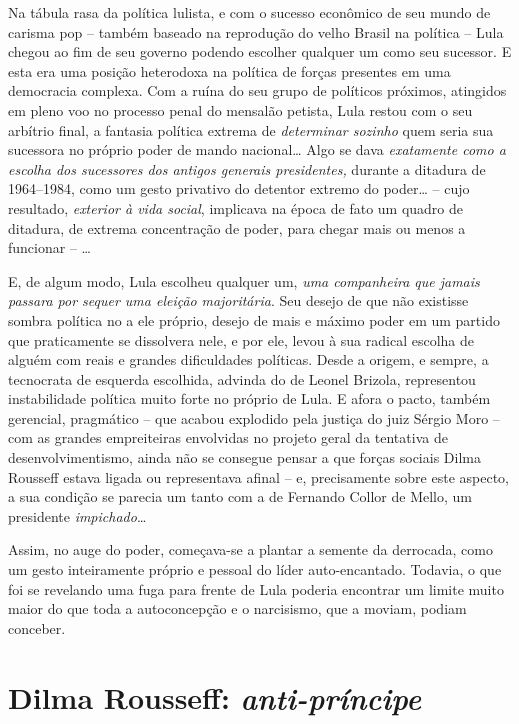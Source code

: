 Na tábula rasa da política lulista, e com o sucesso econômico de seu
mundo de carisma pop -- também baseado na reprodução do velho Brasil na
política -- Lula chegou ao fim de seu governo podendo escolher qualquer
um como seu sucessor. E esta era uma posição heterodoxa na política de
forças presentes em uma democracia complexa. Com a ruína do seu grupo de
políticos próximos, atingidos em pleno voo no processo penal do mensalão
petista, Lula restou com o seu arbítrio final, a fantasia política
extrema de \emph{determinar sozinho} quem seria sua sucessora no próprio
poder de mando nacional… Algo se dava \emph{exatamente como a escolha
dos sucessores dos antigos generais presidentes,} durante a ditadura de
1964--1984, como um gesto privativo do detentor extremo do poder… --
cujo resultado, \emph{exterior à vida social}, implicava na época de
fato um quadro de ditadura, de extrema concentração de poder, para
chegar mais ou menos a funcionar -- …

E, de algum modo, Lula escolheu qualquer um, \emph{uma companheira que
jamais passara por sequer uma eleição} \emph{majoritária}. Seu desejo de
que não existisse sombra política no  a ele próprio, desejo de mais e
máximo poder em um partido que praticamente se dissolvera nele, e por
ele, levou à sua radical escolha de alguém com reais e grandes
dificuldades políticas. Desde a origem, e sempre, a tecnocrata de
esquerda escolhida, advinda do  de Leonel Brizola, representou
instabilidade política muito forte no próprio  de Lula. E afora o
pacto, também gerencial, pragmático -- que acabou explodido pela justiça
do juiz Sérgio Moro -- com as grandes empreiteiras envolvidas no projeto
geral da tentativa de desenvolvimentismo, ainda não se consegue pensar a
que forças sociais Dilma Rousseff estava ligada ou representava afinal
-- e, precisamente sobre este aspecto, a sua condição se parecia um
tanto com a de Fernando Collor de Mello, um presidente
\emph{impichado}…

Assim, no auge do poder, começava-se a plantar a semente da derrocada,
como um gesto inteiramente próprio e pessoal do líder auto-encantado. 
Todavia, o que foi se revelando uma fuga para frente de Lula poderia
encontrar um limite muito maior do que toda a autoconcepção e o
narcisismo, que a moviam, podiam conceber.

  \section{Dilma Rousseff:
  \emph{anti-príncipe}}\label{dilma-rousseff-anti-pruxedncipe}

